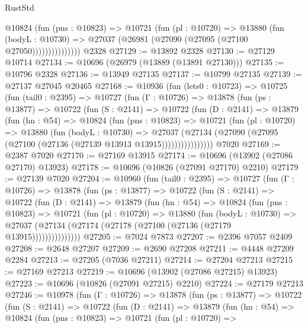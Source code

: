 \begin{lexlean}{RustStd}
\begin{coremodule}
                  @10824
                    (fun (pns : @10823) =>
                    @10721
                      (fun (pl : @10720) =>
                      @13880
                        (fun (bodyL : @10730) =>
                        @27037 (@26981 (@27090 (@27095 (@27100 @27050)))))))))))))))
    @2328
@27129 := @13892 @2328
@27130 := @27129 @10714
@27134 := @10696 (@26979 (@13889 (@13891 @27130)))
@27135 := @10796 @2328
@27136 := @13949 @27135
@27137 := @10799 @27135
@27139 := @27137 @27045 @20465
@27168 := @10936
    (fun (lets0 : @10723) =>
    @10725
      (fun (tail0 : @2395) =>
      @10727
        (fun (Γ : @10726) =>
        @13878
          (fun (ps : @13877) =>
          @10722
            (fun (S : @2141) =>
            @10722
              (fun (D : @2141) =>
              @13879
                (fun (hn : @54) =>
                @10824
                  (fun (pns : @10823) =>
                  @10721
                    (fun (pl : @10720) =>
                    @13880
                      (fun (bodyL : @10730) =>
                      @27037
                        (@27134
                          (@27090 (@27095 (@27100 (@27136 (@27139 @13913 @13915))))))))))))))))
    @7020
@27169 := @2387 @7020
@27170 := @27169 @13915
@27174 := @10696 (@13902 (@27086 @27170) @13923)
@27178 := @10696 (@10826 (@27091 @27170) @2210)
@27179 := @27139 @7020
@27204 := @10960
    (fun (tail0 : @2395) =>
    @10727
      (fun (Γ : @10726) =>
      @13878
        (fun (ps : @13877) =>
        @10722
          (fun (S : @2141) =>
          @10722
            (fun (D : @2141) =>
            @13879
              (fun (hn : @54) =>
              @10824
                (fun (pns : @10823) =>
                @10721
                  (fun (pl : @10720) =>
                  @13880
                    (fun (bodyL : @10730) =>
                    @27037 (@27134 (@27174 (@27178 (@27100 (@27136 (@27179 @13915)))))))))))))))
@27205 := @7024 @7873
@27207 := @2396 @7057 @2409
@27208 := @2648 @27207
@27209 := @2690 @27208
@27211 := @4448 @27209 @2284
@27213 := @27205 (@7036 @27211)
@27214 := @27204 @27213
@27215 := @27169 @27213
@27219 := @10696 (@13902 (@27086 @27215) @13923)
@27223 := @10696 (@10826 (@27091 @27215) @2210)
@27224 := @27179 @27213
@27246 := @10978
    (fun (Γ : @10726) =>
    @13878
      (fun (ps : @13877) =>
      @10722
        (fun (S : @2141) =>
        @10722
          (fun (D : @2141) =>
          @13879
            (fun (hn : @54) =>
            @10824
              (fun (pns : @10823) =>
              @10721
                (fun (pl : @10720) =>

\end{coremodule}
\end{lexlean}
